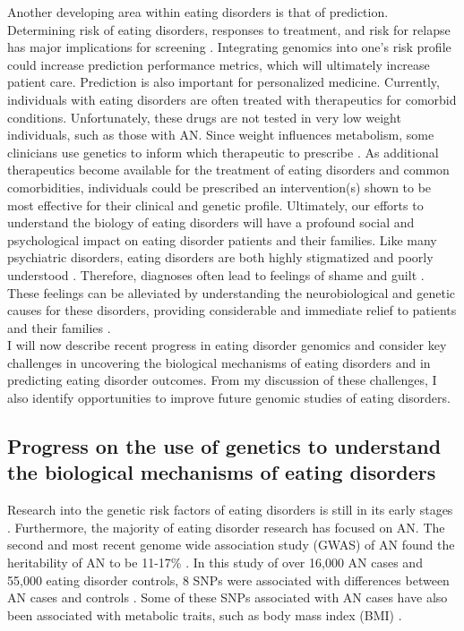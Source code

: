 Another developing area within eating disorders is that of prediction. Determining risk of eating disorders, responses to treatment, and risk for relapse has major implications for screening \cite{RN4543}. Integrating genomics into one's risk profile could increase prediction performance metrics, which will ultimately increase patient care. Prediction is also important for personalized medicine. Currently, individuals with eating disorders are often treated with therapeutics for comorbid conditions. Unfortunately, these drugs are not tested in very low weight individuals, such as those with AN. Since weight influences metabolism, some clinicians use genetics to inform which therapeutic to prescribe \cite{RN4212}. As additional therapeutics become available for the treatment of eating disorders and common comorbidities, individuals could be prescribed an intervention(s) shown to be most effective for their clinical and genetic profile. 
	Ultimately, our efforts to understand the biology of eating disorders will have a profound social and psychological impact on eating disorder patients and their families. Like many psychiatric disorders, eating disorders are both highly stigmatized and poorly understood \cite{RN4212}. Therefore, diagnoses often lead to feelings of shame and guilt \cite{RN1089}. These feelings can be alleviated by understanding the neurobiological and genetic causes for these disorders, providing considerable and immediate relief to patients and their families \cite{RN4212}.
\\
I will now describe recent progress in eating disorder genomics and consider key challenges in uncovering the biological mechanisms of eating disorders and in predicting eating disorder outcomes. From my discussion of these challenges, I also identify opportunities to improve future genomic studies of eating disorders. 

\subsection{Progress on the use of genetics to understand the biological mechanisms of eating disorders}
Research into the genetic risk factors of eating disorders is still in its early stages \cite{RN4212}. Furthermore, the majority of eating disorder research has focused on AN. The second and most recent genome wide association study (GWAS) of AN found the heritability of AN to be 11-17\% \cite{RN4568}. In this study of over 16,000 AN cases and 55,000 eating disorder controls, 8 SNPs were associated with differences between AN cases and controls \cite{RN4568}. Some of these SNPs associated with AN cases have also been associated with metabolic traits, such as body mass index (BMI) \cite{RN4568}. 

